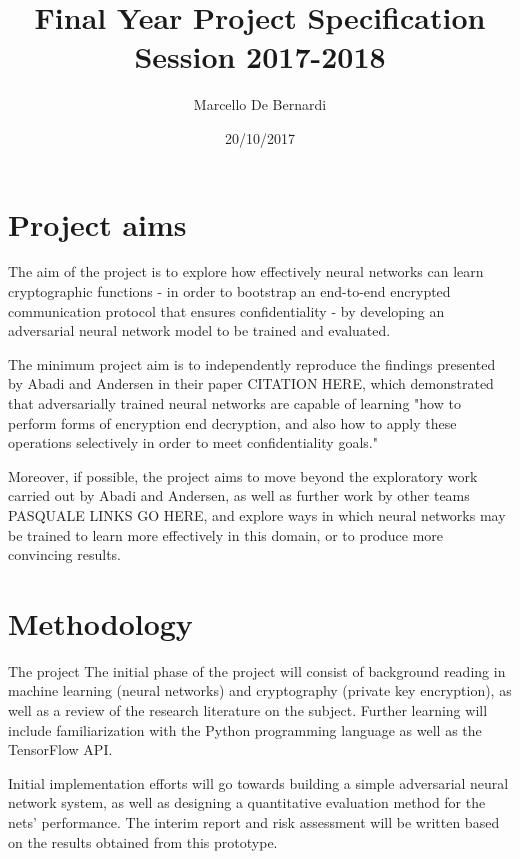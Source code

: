 \documentclass[12pt, titlepage]{article}
\title{%
  \Large Final Year Project Specification\\
  \large Session 2017-2018}
\author{Marcello De Bernardi}
\date{20/10/2017}
\begin{document}
\maketitle
\tableofcontents


\section{Project aims}
The aim of the project is to explore how effectively neural networks
can learn cryptographic functions - in order to bootstrap an end-to-end
encrypted communication protocol that ensures confidentiality - by developing
an adversarial neural network model to be trained and evaluated.

The minimum project aim is to independently reproduce the findings
presented by Abadi and Andersen in their paper CITATION HERE, which
demonstrated that adversarially trained neural networks are
capable of learning "how to perform forms of encryption end decryption,
and also how to apply these operations selectively in order to meet
confidentiality goals."

Moreover, if possible, the project aims to move beyond the exploratory
work carried out by Abadi and Andersen, as well as further work by other
teams PASQUALE LINKS GO HERE, and explore ways in which neural networks
may be trained to learn more effectively in this domain, or to produce
more convincing results.


\section{Methodology}
The project
The initial phase of the project will consist of background reading in
machine learning (neural networks) and cryptography (private key encryption),
as well as a review of the research literature on the subject. Further
learning will include familiarization with the Python programming language as
well as the TensorFlow API.

Initial implementation efforts will go towards building a simple adversarial
neural network system, as well as designing a quantitative evaluation method
for the nets' performance. The interim report and risk assessment will be
written based on the results obtained from this prototype.
\end{document}
